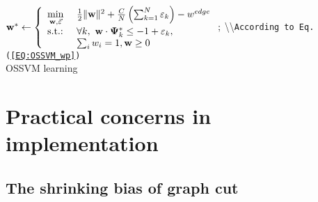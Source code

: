 \documentclass[10pt,journal,compsoc]{newIEEEtran}
\begin{document}
\begin{algorithm}
	$
	\mathbf{w}^*\leftarrow\left\{\begin{array}{ll}
	\min\limits_{\mathbf{w},\vec{\varepsilon}}~& {1\over2}\|\mathbf{w}\|^2 + {C\over N}\left(\sum_{k=1}^N \varepsilon_k\right) - w^{edge} \\
	\hbox{s.t.:}~&  \forall k,~ \mathbf{w}\cdot\mathbf{\Psi}^*_k\leq -1+\varepsilon_k, \\
	&  \sum_i w_i=1, \mathbf{w}\geq 0 \\
	\end{array}\right.;
	$
	\textbackslash{}\textbackslash{}\texttt{According to Eq. (\ref{EQ:OSSVM_wp})}\\
	\caption{OSSVM learning}\label{ALG:OSSVM}
\end{algorithm}\section{Practical concerns in implementation}\label{sec:practical}\subsection{The shrinking bias of graph cut}
\end{document}
